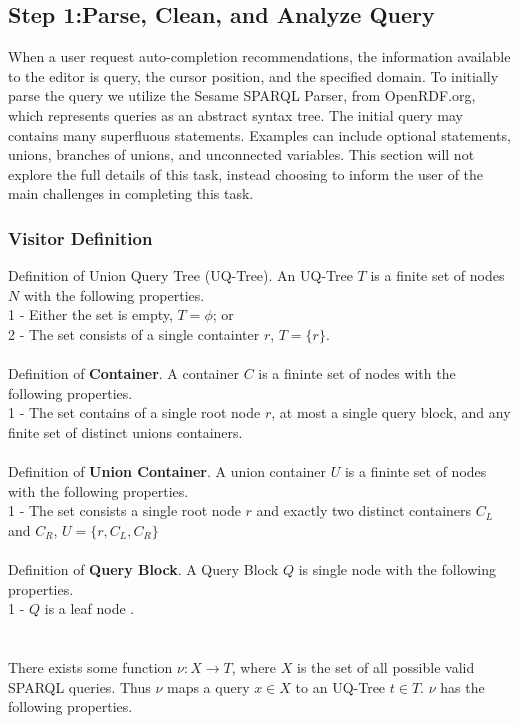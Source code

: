 \documentclass[11pt,onecolumn]{article}
\begin{document}
\subsection{Step 1:Parse, Clean, and Analyze Query}
When a user request auto-completion recommendations, the information available to the editor is query, the cursor position, and the specified domain.  To initially parse the query we utilize the Sesame SPARQL Parser, from OpenRDF.org, which represents queries as an abstract syntax tree.  The initial query may contains many superfluous statements.  Examples can include optional statements, unions, branches of unions, and unconnected variables.  This section will not explore the full details of this task, instead choosing to inform the user of the main challenges in completing this task.


\subsubsection{Visitor Definition}
Definition of {\bfAbstract Union Query Tree (UQ-Tree)}.  An UQ-Tree $T$ is a finite set of nodes $N$ with the following properties.\\
1 - Either the set is empty, $T = \phi$; or\\
2 - The set consists of a single containter $r$, $T = \{ r \}$. \\
\\
Definition of {\bf Container}.  A container $C$ is a fininte set of nodes with the following properties.\\
1 - The set contains of a single root node $r$, at most a single query block, and any finite set of distinct unions containers.\\
\\
Definition of {\bf Union Container}.  A union container $U$ is a fininte set of nodes with the following properties.\\
1 - The set consists a single root node $r$ and exactly two distinct containers $C_L$ and $C_R$, $U = \{ r, C_L, C_R \}$ \\
\\
Definition of {\bf Query Block}.  A Query Block $Q$ is single node with the following properties.\\
1 - $Q$ is a leaf node .\\
\\
\\
There exists some function $\nu: X \rightarrow T $, where $X$ is the set of all possible valid SPARQL queries. Thus $\nu$ maps a query $x \in X$ to an UQ-Tree $t \in T$.  $\nu$ has the following properties.\\
\end{document}
